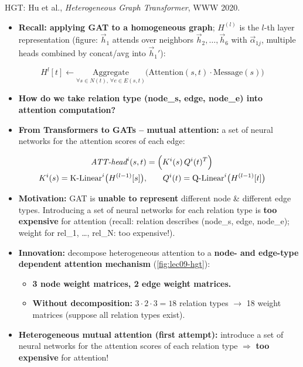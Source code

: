 HGT: Hu et al., \emph{Heterogeneous Graph Transformer}, WWW 2020.
\begin{itemize}
  \item \textbf{Recall: applying GAT to a homogeneous graph}; $H^{(l)}$ is the
    $l$-th layer representation (figure: $\vec{h}_1$ attends over neighbors
    $\vec{h}_2,\dots,\vec{h}_6$ with $\vec{\alpha}_{1j}$, multiple heads combined
    by concat/avg into $\vec{h}_1'$):
\end{itemize}
\begin{equation}\label{eq:lec09-gat-hgt}
  H^{l}[t] \leftarrow \underset{\forall s\in N(t),\,\forall e\in E(s,t)}{\mathrm{Aggregate}}
    \big(\mathrm{Attention}(s,t)\cdot\mathrm{Message}(s)\big)
\end{equation}
\begin{itemize}
  \item[] \textbf{How do we take relation type (node\_s, edge, node\_e) into
    attention computation?}
  \item \textbf{From Transformers to GATs -- mutual attention:} a set of neural
    networks for the attention scores of each edge:
\end{itemize}
\begin{align}
  \textit{ATT-head}^{i}(s,t) &= \Big(K^{i}(s)\,Q^{i}(t)^{T}\Big)
    \label{eq:lec09-mutual}\\
  K^{i}(s) = \text{K-Linear}^{i}\big(H^{(l-1)}[s]\big),&\qquad
  Q^{i}(t) = \text{Q-Linear}^{i}\big(H^{(l-1)}[t]\big)
    \notag
\end{align}
\begin{itemize}
  \item \textbf{Motivation:} GAT is \textbf{unable to represent} different node
    \& different edge types. Introducing a set of neural networks for each
    relation type is \textbf{too expensive} for attention (recall: relation
    describes (node\_s, edge, node\_e); weight for rel\_1, \dots, rel\_N: too
    expensive!).
  \item \textbf{Innovation:} decompose heterogeneous attention to a \textbf{node-
    and edge-type dependent attention mechanism} (\cref{fig:lec09-hgt}):
    \begin{itemize}
      \item \textbf{3 node weight matrices, 2 edge weight matrices.}
      \item \textbf{Without decomposition:} $3\cdot2\cdot3=18$ relation types
        $\to$ 18 weight matrices (suppose all relation types exist).
    \end{itemize}
  \item \textbf{Heterogeneous mutual attention (first attempt):} introduce a set
    of neural networks for the attention scores of each relation type
    $\Rightarrow$ \textbf{too expensive} for attention!
\end{itemize}
